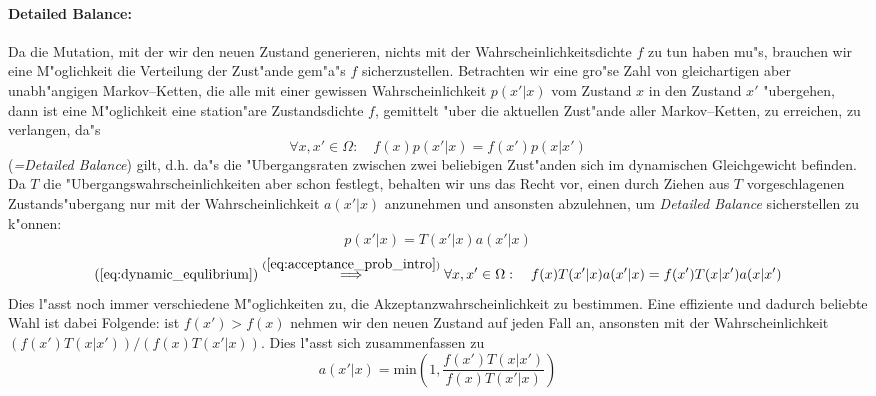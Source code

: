 \documentclass[11pt,a4paper,DIVcalc,BCOR8mm,titlepage,twoside]{scrartcl}
\begin{document}
	\paragraph{Detailed Balance:}
	Da die Mutation, mit der wir den neuen Zustand generieren, nichts mit der Wahrscheinlichkeitsdichte $f$ zu tun haben mu"s, brauchen wir eine M"oglichkeit die Verteilung der Zust"ande gem"a"s $f$ sicherzustellen.
	Betrachten wir eine gro"se Zahl von gleichartigen aber unabh"angigen Markov--Ketten, die alle mit einer gewissen Wahrscheinlichkeit $p(x'|x)$ vom Zustand $x$ in den Zustand $x'$ "ubergehen, dann ist eine M"oglichkeit eine station"are Zustandsdichte $f$, gemittelt "uber die aktuellen Zust"ande aller Markov--Ketten, zu erreichen, zu verlangen, da"s
	\begin{equation}
		\forall x,x' \in \Omega :\quad f(x)p(x'|x) = f(x')p(x|x')
		\label{eq:dynamic_equlibrium}
	\end{equation}
	({\em =Detailed Balance}) gilt, d.h. da"s die "Ubergangsraten zwischen zwei beliebigen Zust"anden sich im dynamischen Gleichgewicht befinden.
	Da $T$ die "Ubergangswahrscheinlichkeiten aber schon festlegt, behalten wir uns das Recht vor, einen durch Ziehen aus $T$ vorgeschlagenen Zustands"ubergang nur mit der Wahrscheinlichkeit $a(x'|x)$ anzunehmen und ansonsten abzulehnen,	um {\em Detailed Balance} sicherstellen zu k"onnen:
	\begin{equation}
		p(x'|x) = T(x'|x)a(x'|x)
		\label{eq:acceptance_prob_intro}
	\end{equation}
	\begin{equation}
		(\ref{eq:dynamic_equlibrium}) \stackrel{(\ref{eq:acceptance_prob_intro})}{\Longrightarrow}
		\forall x,x' \in \Omega :\quad f(x)T(x'|x)a(x'|x) = f(x')T(x|x')a(x|x')
		\label{eq:detailedbalance}
	\end{equation}
	Dies l"asst noch immer verschiedene M"oglichkeiten zu, die Akzeptanzwahrscheinlichkeit zu bestimmen. Eine effiziente und dadurch beliebte Wahl ist dabei Folgende: ist $f(x')>f(x)$ nehmen wir den neuen Zustand auf jeden Fall an, ansonsten mit der Wahrscheinlichkeit $(f(x')T(x|x'))/(f(x)T(x'|x))$. Dies l"asst sich zusammenfassen zu
	\begin{equation}
		a(x'|x)=\text{min}\left(1,\frac{f(x')T(x|x')}{f(x)T(x'|x)}\right)
		\label{eq:acceptanceratio}
	\end{equation}
	
	
\end{document}
